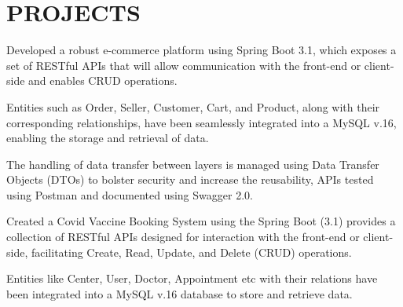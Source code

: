 \documentclass[]{deedy-resume-openfont}
\begin{document}
\begin{minipage}[t]{0.66\textwidth}



\section{PROJECTS}
\begin{tightemize}
\item Developed a robust e-commerce platform using Spring Boot 3.1, which exposes a set of RESTful APIs that will allow communication with the front-end or client-side and enables CRUD operations.
\item Entities such as Order, Seller, Customer, Cart, and Product, along with their corresponding relationships, have been seamlessly integrated into a MySQL v.16, enabling the storage and retrieval of data.
\item The handling of data transfer between layers is managed using Data Transfer Objects (DTOs) to bolster security and increase the reusability, APIs tested using Postman and documented using Swagger 2.0.
\end{tightemize}
\sectionsep



\begin{tightemize}

\item Created a Covid Vaccine Booking System using the Spring Boot (3.1) provides a collection of RESTful APIs designed for interaction with the front-end or client-side, facilitating Create, Read, Update, and Delete (CRUD) operations.

\item Entities like Center, User, Doctor, Appointment etc with their relations have been integrated into a MySQL v.16 database to store and retrieve data.


\end{tightemize}
\end{minipage}
\end{document}
